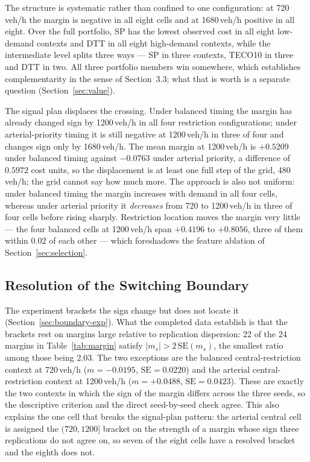 The structure is systematic rather than confined to one configuration: at 720\,veh/h the
margin is negative in all eight cells and at 1680\,veh/h positive in all eight. Over the
full portfolio, SP has the lowest observed cost in all eight low-demand contexts and DTT
in all eight high-demand contexts, while the intermediate level splits three ways --- SP
in three contexts, TECO10 in three and DTT in two. All three portfolio members win
somewhere, which establishes complementarity in the sense of Section~3.3; what that is
worth is a separate question (Section~\ref{sec:value}).

The signal plan displaces the crossing. Under balanced timing the margin has already
changed sign by 1200\,veh/h in all four restriction configurations; under
arterial-priority timing it is still negative at 1200\,veh/h in three of four and changes
sign only by 1680\,veh/h. The mean margin at 1200\,veh/h is $+0.5209$ under balanced
timing against $-0.0763$ under arterial priority, a difference of $0.5972$ cost units, so
the displacement is at least one full step of the grid, 480\,veh/h; the grid cannot say
how much more. The approach is also not uniform: under balanced timing the margin
increases with demand in all four cells, whereas under arterial priority it
\emph{decreases} from 720 to 1200\,veh/h in three of four cells before rising sharply.
Restriction location moves the margin very little --- the four balanced cells at
1200\,veh/h span $+0.4196$ to $+0.8056$, three of them within $0.02$ of each other ---
which foreshadows the feature ablation of Section~\ref{sec:selection}.

\subsection{Resolution of the Switching Boundary}
\label{sec:noise}

The experiment brackets the sign change but does not locate it
(Section~\ref{sec:boundary-exp}). What the completed data establish is that the brackets
rest on margins large relative to replication dispersion: 22 of the 24 margins in
Table~\ref{tab:margin} satisfy $|m_s|>2\,\mathrm{SE}(m_s)$, the smallest ratio among
those being 2.03. The two exceptions are the balanced central-restriction context at
720\,veh/h ($m=-0.0195$, $\mathrm{SE}=0.0220$) and the arterial central-restriction
context at 1200\,veh/h ($m=+0.0488$, $\mathrm{SE}=0.0423$). These are exactly the two
contexts in which the sign of the margin differs across the three seeds, so the
descriptive criterion and the direct seed-by-seed check agree. This also explains the one
cell that breaks the signal-plan pattern: the arterial central cell is assigned the
$(720,1200]$ bracket on the strength of a margin whose sign three replications do not
agree on, so seven of the eight cells have a resolved bracket and the eighth does not.

